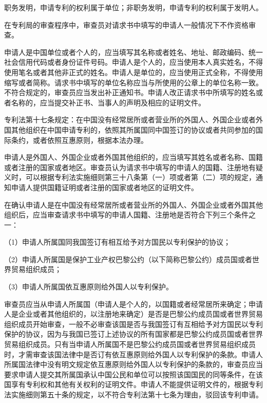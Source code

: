 职务发明，申请专利的权利属于单位；非职务发明，申请专利的权利属于发明人。

在专利局的审查程序中，审查员对请求书中填写的申请人一般情况下不作资格审查。

申请人是中国单位或者个人的，应当填写其名称或者姓名、地址、邮政编码、统一社会信用代码或者身份证件号码。申请人是个人的，应当使用本人真实姓名，不得使用笔名或者其他非正式的姓名。申请人是单位的，应当使用正式全称，不得使用缩写或者简称。请求书中填写的单位名称应当与所使用的公章上的单位名称一致。不符合规定的，审查员应当发出补正通知书。申请人改正请求书中所填写的姓名或者名称的，应当提交补正书、当事人的声明及相应的证明文件。

专利法第十七条规定：在中国没有经常居所或者营业所的外国人、外国企业或者外国其他组织在中国申请专利的，依照其所属国同中国签订的协议或者共同参加的国际条约，或者依照互惠原则，根据本法办理。

申请人是外国人、外国企业或者外国其他组织的，应当填写其姓名或者名称、国籍或者注册的国家或者地区。审查员认为请求书中填写的申请人的国籍、注册地有疑义时，可以根据专利法实施细则第三十八条第（一）项或者第（二）项的规定，通知申请人提供国籍证明或者注册的国家或者地区的证明文件。

在确认申请人是在中国没有经常居所或者营业所的外国人、外国企业或者外国其他组织后，应当审查请求书中填写的申请人国籍、注册地是否符合下列三个条件之一：

{\setlength{\parindent}{17.1bp}（1）申请人所属国同我国签订有相互给予对方国民以专利保护的协议；\par}

{\setlength{\parindent}{17.1bp}（2）申请人所属国是保护工业产权巴黎公约（以下简称巴黎公约）成员国或者世界贸易组织成员；\par}

{\setlength{\parindent}{17.1bp}（3）申请人所属国依互惠原则给外国人以专利保护。\par}

审查员应当从申请人所属国（申请人是个人的，以国籍或者经常居所来确定；申请人是企业或者其他组织的，以注册地来确定）是否是巴黎公约成员国或者世界贸易组织成员开始审查，一般不必审查该国是否与我国签订有互相给予对方国民以专利保护的协议，因为与我国已签订上述协议的所有国家都是巴黎公约成员国或者世界贸易组织成员。只有当申请人所属国不是巴黎公约成员国或者世界贸易组织成员时，才需审查该国法律中是否订有依互惠原则给外国人以专利保护的条款。申请人所属国法律中没有明文规定依互惠原则给外国人以专利保护的条款的，审查员应当要求申请人提交其所属国承认中国公民和单位可以按照该国国民的同等条件，在该国享有专利权和其他有关权利的证明文件。申请人不能提供证明文件的，根据专利法实施细则第五十条的规定，以不符合专利法第十七条为理由，驳回该专利申请。

